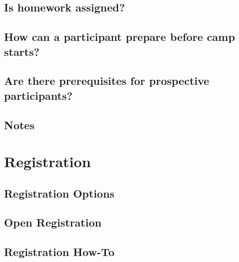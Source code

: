 \documentclass[letterpaper,10pt,english]{sphinxmanual}
\begin{document}
\section{Is homework assigned?}
\label{faq:is-homework-assigned}

\section{How can a participant prepare before camp starts?}
\label{faq:how-can-a-participant-prepare-before-camp-starts}

\section{Are there prerequisites for prospective participants?}
\label{faq:are-there-prerequisites-for-prospective-participants}

\section{Notes}
\label{faq:notes}

\chapter{Registration}
\label{registration::doc}\label{registration:index-0}\label{registration:registration}

\section{Registration Options}
\label{registration:registration-options}

\section{Open Registration}
\label{registration:open-registration}

\section{Registration How-To}
\label{registration:registration-how-to}


\renewcommand{\indexname}{Index}
\printindex
\end{document}
